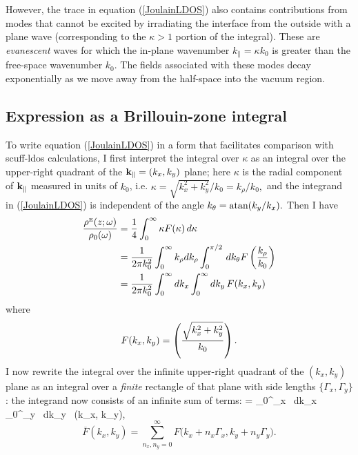 \documentclass[letterpaper]{article}
\begin{document}
However, the trace in equation (\ref{JoulainLDOS}) also contains
contributions from modes that cannot be excited by irradiating
the interface from the outside with a plane wave (corresponding
to the $\kappa>1$ portion of the integral). These are 
\textit{evanescent} waves for which the in-plane wavenumber
$k_\parallel=\kappa k_0$ is greater than the free-space wavenumber 
$k_0$. The fields associated with these modes decay exponentially
as we move away from the half-space into the vacuum region. 

\subsection*{Expression as a Brillouin-zone integral}

To write equation (\ref{JoulainLDOS}) in a form that facilitates
comparison with {\sc scuff-ldos} calculations, I first interpret
the integral over $\kappa$ as an integral over the upper-right
quadrant of the $\mathbf{k}_\parallel=(k_x,k_y)$ plane; here
$\kappa$ is the radial component of $\mathbf{k}_\parallel$ measured in
units of $k_0$, i.e. $\kappa=\sqrt{k_x^2 + k_y^2}/k_0=k_\rho/k_0,$ 
and the integrand in (\ref{JoulainLDOS}) is independent of the 
angle $k_\theta=\text{atan}(k_y/k_x).$ Then I have
\begin{align*}
 \frac{\rho^{\hbox{\tiny{E}}}(z; \omega)}{\rho_0(\omega)}
  &=\frac{1}{4}\int_0^\infty \kappa F(\kappa) \, d\kappa
\\
  &=\frac{1}{2\pi k_0^2}
    \int_0^\infty k_\rho dk_\rho \int_0^{\pi/2} \, dk_\theta F\left(\frac{k_\rho}{k_0}\right)
\\
  &=\frac{1}{2\pi k_0^2}
    \int_0^\infty dk_x \int_0^\infty dk_y \, F(k_x, k_y)
\end{align*}
where 
$$ F(k_x, k_y)=\left(\frac{\sqrt{k_x^2 + k_y^2}}{k_0}\right).$$
I now rewrite the integral over the infinite upper-right
quadrant of the $(k_x,k_y)$ plane as an integral over a
\textit{finite} rectangle of that plane with side lengths 
$\{\Gamma_x, \Gamma_y\}$: the integrand now consists of an 
infinite sum of terms: 
{
  = 
    \int_0^{\Gamma_x} \, dk_x \, \int_0^{\Gamma_y} \, dk_y \,
    (k_x, k_y),
}
$$
    \overline{F}(k_x, k_y)=\sum_{n_x,n_y=0}^\infty 
              F\Big( k_x + n_x \Gamma_x, k_y + n_y\Gamma_y \Big).
$$
\end{document}
